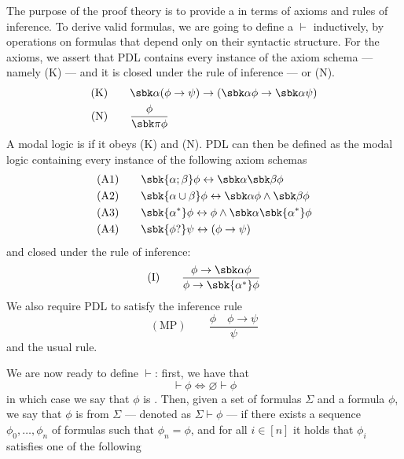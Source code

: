 \documentclass[a4paper, 12pt]{report}
\begin{document}
    The purpose of the proof theory is to provide a  in terms of axioms and rules of inference. To derive valid formulas, we are going to define a  $\vdash$ inductively, by operations on formulas that depend only on their syntactic structure. For the axioms, we assert that PDL contains every instance of the  axiom schema --- namely (K) --- and it is closed under the  rule of inference --- or  (N).
    \begin{equation*}
        \begin{alignedat}{2}
            (\mbox K) & \quad \quad && \sbk \alpha (\phi \to \psi) \to (\sbk \alpha \phi \to \sbk \alpha \psi) \\
            (\mbox N) & \quad \quad && \dfrac{\phi}{\sbk \pi \phi} \\
        \end{alignedat}
    \end{equation*}
    A modal logic is  if it obeys (K) and (N). PDL can then be defined as the  modal logic containing every instance of the following axiom schemas
    \begin{equation*}
        \begin{alignedat}{2}
            (\mbox A 1) & \quad \quad && \sbk{\alpha ; \beta} \phi \leftrightarrow \sbk \alpha \sbk \beta \phi \\
            (\mbox A 2) & \quad \quad && \sbk{\alpha \cup \beta} \phi \leftrightarrow \sbk \alpha \phi \land \sbk \beta \phi \\
            (\mbox A 3) & \quad \quad && \sbk{\alpha ^*} \phi \leftrightarrow \phi \land \sbk \alpha \sbk{\alpha ^*} \phi \\
            (\mbox A 4) & \quad \quad && \sbk{\phi?} \psi \leftrightarrow (\phi \to \psi) \\
        \end{alignedat}
    \end{equation*}
    and closed under the  rule of inference: $$(\mbox I) \quad \quad \dfrac{\phi \to \sbk \alpha \phi}{\phi \to \sbk{\alpha^*} \phi}$$ We also require PDL to satisfy the  inference rule $$(\mbox{MP}) \quad \quad \dfrac{\phi \quad \phi \to \psi}{\psi}$$ and the usual  rule.

    We are now ready to define $\vdash$: first, we have that $$\vdash \phi \iff \varnothing \vdash \phi$$ in which case we say that $\phi$ is . Then, given a set of formulas $\Sigma$ and a formula $\phi$, we say that $\phi$ is  from $\Sigma$ --- denoted as $\Sigma \vdash \phi$ --- if there exists a sequence $\phi_0, \ldots, \phi_n$ of formulas such that $\phi_n = \phi$, and for all $i \in [n]$ it holds that $\phi_i$ satisfies one of the following
\end{document}
